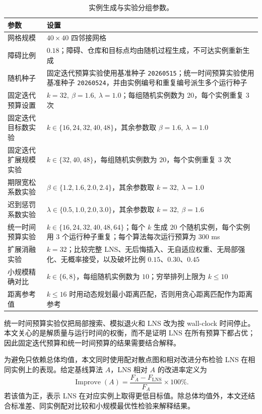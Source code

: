 \documentclass[11pt,a4paper]{ctexart}
\begin{document}
\begin{table}[!htbp]
\centering
\small
\caption{实例生成与实验分组参数。}
\label{tab:instance-params}
\begin{tabular}{p{}p{}}
\toprule
参数 & 设置 \\
\midrule
网格规模 & $40\times 40$ 四邻接网格 \\
障碍比例 & $0.18$；障碍、仓库和目标点均由随机过程生成，不可达实例重新生成 \\
随机种子 & 固定迭代预算实验使用基准种子 \texttt{20260515}；统一时间预算实验使用基准种子 \texttt{20260524}，并由实例编号和重复编号派生多个运行种子 \\
固定迭代预算设置 & $k=32,\ \beta=1.6,\ \lambda=1.0$；每组随机实例数为 $20$，每个实例重复 $3$ 次 \\
固定迭代目标数实验 & $k\in\{16,24,32,40,48\}$，其余参数取 $\beta=1.6,\ \lambda=1.0$ \\
固定迭代扩展规模实验 & $k\in\{32,40,48\}$，每组随机实例数为 $20$，每个实例重复 $3$ 次 \\
期限宽松系数实验 & $\beta\in\{1.2,1.6,2.0,2.4\}$，其余参数取 $k=32,\ \lambda=1.0$ \\
迟到惩罚系数实验 & $\lambda\in\{0.5,1.0,2.0,3.0\}$，其余参数取 $k=32,\ \beta=1.6$ \\
统一时间预算实验 & $k\in\{16,24,32,40,48,64\}$；每个 $k$ 生成 $20$ 个随机实例，每个实例用 $3$ 个运行种子重复；每个算法每次运行预算为 $300$ ms \\
扩展消融实验 & $k=32$；比较完整 LNS、无后悔插入、无自适应权重、无局部强化、无概率接受，以及破坏比例 $0.15$、$0.30$、$0.45$ \\
小规模精确对比 & $k\in\{6,8\}$，每组随机实例数为 $10$；穷举排列上限为 $k\le 10$ \\
距离参考值 & $k\le16$ 时用动态规划最小距离匹配，否则用贪心距离匹配作为距离参考 \\
\bottomrule
\end{tabular}
\end{table}

\indent 统一时间预算实验仅把局部搜索、模拟退火和 LNS 改为按 wall-clock 时间停止。本文关心的是解质量与运行时间的权衡，而不是证明 LNS 在所有预算下都占优；因此固定迭代预算和统一时间预算的结果需要结合解释。

\indent 为避免只依赖总体均值，本文同时使用配对散点图和相对改进分布检验 LNS 在相同实例上的表现。给定基线算法 $A$，LNS 相对 $A$ 的改进率定义为
\begin{equation}
\operatorname{Improve}(A)=\frac{F_A-F_{\mathrm{LNS}}}{F_A}\times 100\% .
\end{equation}
\indent 若该值为正，表示 LNS 在对应实例上取得更低目标值。除总体均值外，本文还结合标准差、同实例配对比较和小规模最优性检验来解释结果。
\end{document}

